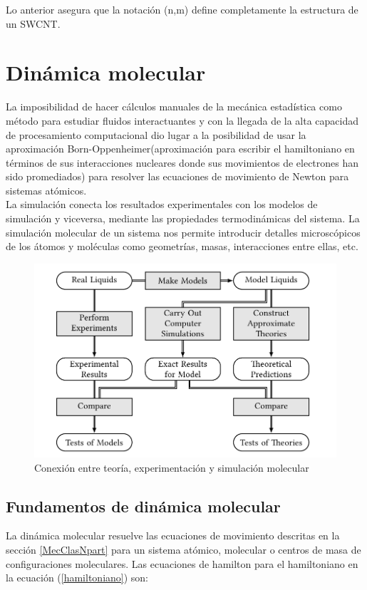 Lo anterior asegura que la notación (n,m) define completamente la estructura de un SWCNT.

\begingroup
\let\clearpage\relax
\chapter{Dinámica molecular}
\endgroup

La imposibilidad de hacer cálculos manuales de la mecánica estadística como método para estudiar fluidos interactuantes y con la llegada de la alta capacidad de procesamiento computacional dio lugar a la posibilidad de usar la aproximación Born-Oppenheimer(aproximación para escribir el hamiltoniano en términos de sus interacciones nucleares donde sus movimientos de electrones han sido promediados) para resolver las ecuaciones de movimiento de Newton para sistemas atómicos. \\

La simulación conecta los resultados experimentales con los modelos de simulación y viceversa, mediante las propiedades termodinámicas del sistema. La simulación molecular de un sistema nos permite introducir detalles microscópicos de los átomos y moléculas como geometrías, masas, interacciones entre ellas, etc.\\


\begin{figure}[!h]
    \centering
    \includegraphics[width=.7\textwidth,keepaspectratio=true]{conexionteoriaexpsim.png}
    \caption{Conexión entre teoría, experimentación y simulación molecular \cite{Allen2017}}
    \label{fig:conteexpsim}
\end{figure}

\section{Fundamentos de dinámica molecular}

La dinámica molecular resuelve las ecuaciones de movimiento descritas en la sección \ref{MecClasNpart} para un sistema atómico, molecular o centros de masa de configuraciones moleculares. Las ecuaciones de hamilton para el hamiltoniano en la ecuación (\ref{hamiltoniano}) son:\\

